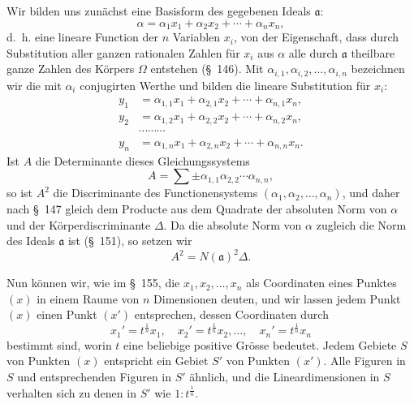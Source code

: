 \documentclass[11pt]{article}
\begin{document}
Wir bilden uns zunächst eine Basisform des gegebenen Ideals $\mathfrak a$:
\begin{equation}
\alpha=\alpha_1x_1+\alpha_2x_2+\cdots+\alpha_nx_n,
\tag{1}
\end{equation}
d.~h. eine lineare Function der $n$ Variablen $x_i$, von der Eigenschaft, dass durch Substitution aller ganzen rationalen Zahlen für $x_i$ aus $\alpha$ alle durch $\mathfrak a$ theilbare ganze Zahlen des Körpers $\Omega$ entstehen (\S~146). Mit $\alpha_{i,1},\alpha_{i,2},\ldots,\alpha_{i,n}$ bezeichnen wir die mit $\alpha_i$ conjugirten Werthe und bilden die lineare Substitution für $x_i$:
\begin{equation}
\begin{aligned}
y_1&=\alpha_{1,1}x_1+\alpha_{2,1}x_2+\cdots+\alpha_{n,1}x_n,\\
y_2&=\alpha_{1,2}x_1+\alpha_{2,2}x_2+\cdots+\alpha_{n,2}x_n,\\
&\cdots\cdots\cdots\\
y_n&=\alpha_{1,n}x_1+\alpha_{2,n}x_2+\cdots+\alpha_{n,n}x_n.
\end{aligned}
\tag{2}
\end{equation}
Ist $A$ die Determinante dieses Gleichungssystems
\[
A=\sum\pm\alpha_{1,1}\alpha_{2,2}\cdots\alpha_{n,n},
\]
so ist $A^2$ die Discriminante des Functionensystems $(\alpha_1,\alpha_2,\ldots,\alpha_n)$, und daher nach \S~147 gleich dem Producte aus dem Quadrate der absoluten Norm von $\alpha$ und der Körperdiscriminante $\Delta$. Da die absolute Norm von $\alpha$ zugleich die Norm des Ideals $\mathfrak a$ ist (\S~151), so setzen wir
\begin{equation}
A^2=N(\mathfrak a)^2\Delta.
\tag{3}
\end{equation}

Nun können wir, wie im \S~155, die $x_1,x_2,\ldots,x_n$ als Coordinaten eines Punktes $(x)$ in einem Raume von $n$ Dimensionen deuten, und wir lassen jedem Punkt $(x)$ einen Punkt $(x')$ entsprechen, dessen Coordinaten durch
\begin{equation}
x_1'=t^{\frac1n}x_1,
\quad x_2'=t^{\frac1n}x_2,
\ldots,
\quad x_n'=t^{\frac1n}x_n
\tag{4}
\end{equation}
bestimmt sind, worin $t$ eine beliebige positive Grösse bedeutet. Jedem Gebiete $S$ von Punkten $(x)$ entspricht ein Gebiet $S'$ von Punkten $(x')$. Alle Figuren in $S$ und entsprechenden Figuren in $S'$ ähnlich, und die Lineardimensionen in $S$ verhalten sich
zu denen in $S'$ wie $1:t^{\frac1n}$.
\end{document}
